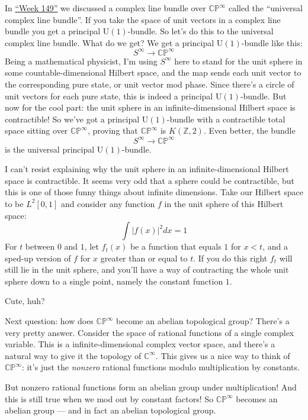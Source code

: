 \documentclass{article}
\begin{document}
In \protect\hyperlink{week149}{``Week 149''} we discussed a complex line
bundle over \(\mathbb{CP}^\infty\) called the ``universal complex line
bundle''. If you take the space of unit vectors in a complex line bundle
you get a principal \(\mathrm{U}(1)\)-bundle. So let's do this to the
universal complex line bundle. What do we get? We get a principal
\(\mathrm{U}(1)\)-bundle like this: \[S^\infty \to \mathbb{CP}^\infty\]
Being a mathematical physicist, I'm using \(S^\infty\) here to stand for
the unit sphere in some countable-dimensional Hilbert space, and the map
sends each unit vector to the corresponding pure state, or unit vector
mod phase. Since there's a circle of unit vectors for each pure state,
this is indeed a principal \(\mathrm{U}(1)\)-bundle. But now for the
cool part: the unit sphere in an infinite-dimensional Hilbert space is
contractible! So we've got a principal \(\mathrm{U}(1)\)-bundle with a
contractible total space sitting over \(\mathbb{CP}^\infty\), proving
that \(\mathbb{CP}^\infty\) is \(K(\mathbb{Z},2)\). Even better, the
bundle \[S^\infty \to \mathbb{CP}^\infty\] is the universal principal
\(\mathrm{U}(1)\)-bundle.

I can't resist explaining why the unit sphere in an infinite-dimensional
Hilbert space is contractible. It seems very odd that a sphere could be
contractible, but this is one of those funny things about infinite
dimensions. Take our Hilbert space to be \(L^2[0,1]\) and consider any
function \(f\) in the unit sphere of this Hilbert space:
\[\int |f(x)|^2 dx = 1\] For \(t\) between \(0\) and \(1\), let
\(f_t(x)\) be a function that equals \(1\) for \(x < t\), and a sped-up
version of \(f\) for \(x\) greater than or equal to \(t\). If you do
this right \(f_t\) will still lie in the unit sphere, and you'll have a
way of contracting the whole unit sphere down to a single point, namely
the constant function \(1\).

Cute, huh?

Next question: how does \(\mathbb{CP}^\infty\) become an abelian
topological group? There's a very pretty answer. Consider the space of
rational functions of a single complex variable. This is a
infinite-dimensional complex vector space, and there's a natural way to
give it the topology of \(\mathbb{C}^\infty\). This gives us a nice way
to think of \(\mathbb{CP}^\infty\): it's just the \emph{nonzero}
rational functions modulo multiplication by constants.

But nonzero rational functions form an abelian group under
multiplication! And this is still true when we mod out by constant
factors! So \(\mathbb{CP}^\infty\) becomes an abelian group --- and in
fact an abelian topological group.
\end{document}
